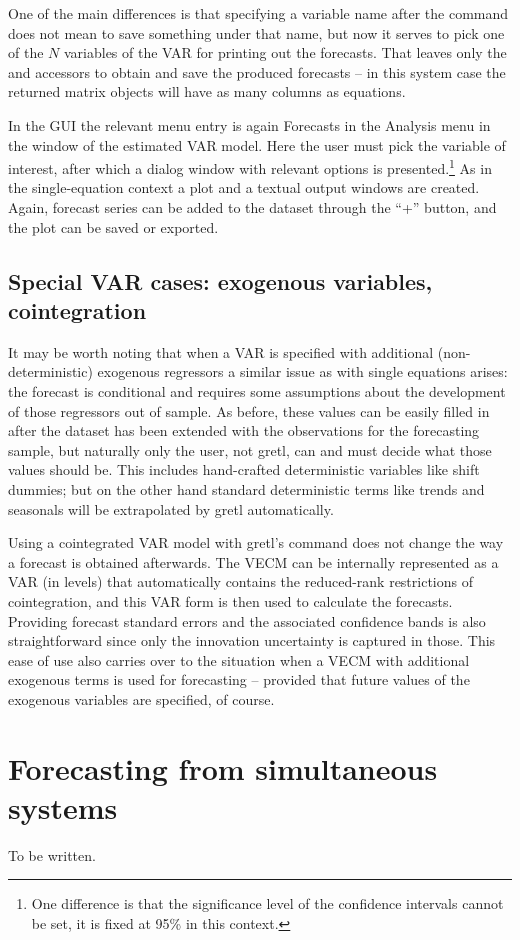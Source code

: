 One of the main differences is that specifying a variable name after the
 command does not mean to save something under that name, but 
now it serves to pick one of the $N$ variables of the VAR for printing
out the forecasts. That leaves only the  and 
accessors to obtain and save the produced forecasts -- in this system 
case the returned matrix objects will have as many columns as equations.

In the GUI the relevant menu entry is again Forecasts in the Analysis 
menu in the window of the estimated VAR model. Here the user must pick
the variable of interest, after which a dialog window with relevant 
options is presented.\footnote{One difference is that the significance
level of the confidence intervals cannot be set, it is fixed at 95\% in
this context.} As in the single-equation context a plot and a textual
output windows are created. Again, forecast series can be added to the 
dataset through the ``+'' button, and the plot can be saved or exported.

\subsection{Special VAR cases: exogenous variables, cointegration}

It may be worth noting that when a VAR is specified with additional
(non-deterministic) exogenous regressors a similar issue as with single
equations arises: the forecast is conditional and requires some
assumptions about the development of those regressors out of sample.
 As before, these values
can be easily filled in after the dataset has been extended with the
observations for the forecasting sample, but naturally only the user,
not gretl, can and must decide what those values should be. This 
includes hand-crafted deterministic variables like shift dummies; but
on the other hand standard deterministic terms like trends and
seasonals will be extrapolated by gretl automatically.

Using a cointegrated VAR model with gretl's  command does not
change the way a forecast is obtained afterwards. The VECM can be 
internally represented as a VAR (in levels) that automatically contains
the reduced-rank restrictions of cointegration, and this VAR form is
then used to calculate the forecasts. Providing forecast standard errors
and the associated confidence bands is also straightforward since only
the innovation uncertainty is captured in those. This ease of use also
carries over to the situation when a VECM with additional exogenous
terms is used for forecasting -- provided that future values of
the exogenous variables are specified, of course.   

\section{Forecasting from simultaneous systems}
\label{sec:fcast-system}

To be written.

    
